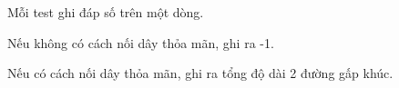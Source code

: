 Mỗi test ghi đáp số trên một dòng.

Nếu không có cách nối dây thỏa mãn, ghi ra -1.

Nếu có cách nối dây thỏa mãn, ghi ra tổng độ dài 2 đường gấp khúc.